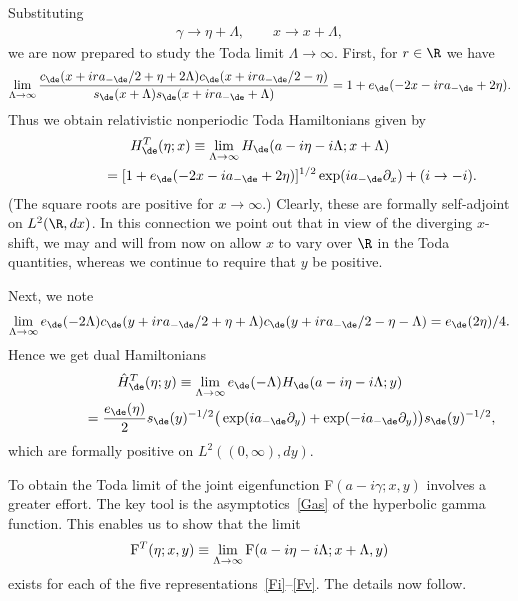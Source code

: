 \documentclass[pdftex]{sigma}
\numberwithin{equation}{section}
\begin{document}
Substituting
\begin{gather}\label{Tsub}
\gamma\to \eta+\Lambda,\qquad x\to x+\Lambda,
\end{gather}
we are now prepared to study the Toda limit $\Lambda\to\infty$. First, for $r\in\R$ we have
\begin{gather}\label{Vlim}
\lim_{\Lambda\to\infty}\frac{c_{\de}(x+ ira_{-\de}/2+\eta+2\Lambda)c_{\de}(x+ ira_{-\de}/2-\eta)}{s_{\de}(x+\Lambda)s_{\de}(x+ ira_{-\de}+\Lambda)}=1+e_{\de}(-2x- ira_{-\de}+2\eta).
\end{gather}
Thus we obtain relativistic nonperiodic Toda Hamiltonians given by
\begin{gather}
H_{\de}^T(\eta;x)     \equiv     \lim_{\Lambda\to\infty}H_{\de}(a-i\eta-i\Lambda;x+\Lambda)
\nonumber \\
\phantom{H_{\de}^T(\eta;x)}{}   =    [1+e_{\de}(-2x-ia_{-\de}+2\eta)]^{1/2}\exp(ia_{-\de}\partial_x)+(i\to -i).\label{HT}
\end{gather}
(The square roots are positive for $x\to\infty$.) Clearly, these are formally self-adjoint on $L^2(\R,dx)$. In this connection we point out that in view of the diverging $x$-shift, we may and will from now on allow $x$ to vary over $\R$ in the Toda quantities, whereas we continue to require that $y$ be positive.

Next, we note
\begin{gather}
\lim_{\Lambda\to\infty}e_{\de}(-2\Lambda)c_{\de}(y+ ira_{-\de}/2+\eta+\Lambda)c_{\de}(y+ ira_{-\de}/2-\eta-\Lambda)
=e_{\de}(2\eta)/4.
\end{gather}
Hence we get dual Hamiltonians
\begin{gather}
\hat{H}_{\de}^T(\eta;y)     \equiv     \lim_{\Lambda\to\infty}e_{\de}(-\Lambda)H_{\de}(a-i\eta-i\Lambda;y)
\nonumber \\
\phantom{\hat{H}_{\de}^T(\eta;y)}{}   =    \frac{e_{\de}(\eta)}{2}s_{\de}(y)^{-1/2}\big(\exp(ia_{-\de}\partial_y)+\exp(-ia_{-\de}\partial_y)\big)s_{\de}(y)^{-1/2},\label{HTd}
\end{gather}
which are formally positive on $L^2((0,\infty),dy)$.

To obtain the Toda limit of the joint eigenfunction F$(a-i\gamma;x,y)$ involves a greater ef\/fort.
The key tool is the asymptotics~\eqref{Gas} of the hyperbolic gamma function. This enables us to show that the limit
\begin{gather}\label{Flim}
{\rm F}^T(\eta;x,y)\equiv \lim_{\Lambda\to\infty}{\rm F}(a-i\eta-i\Lambda;x+\Lambda,y)
\end{gather}
exists for each of the f\/ive representations~\eqref{Fi}--\eqref{Fv}. The details now follow.
\end{document}
